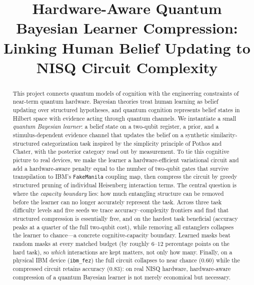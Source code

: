 \documentclass[conference]{IEEEtran}
\begin{document}
\title{Hardware-Aware Quantum Bayesian Learner Compression: Linking Human Belief Updating to NISQ Circuit Complexity}

\author{
}

\maketitle

\begin{abstract}
This project connects quantum models of cognition with the engineering constraints of
near-term quantum hardware. Bayesian theories treat human learning as belief updating
over structured hypotheses, and quantum cognition represents belief states in Hilbert
space with evidence acting through quantum channels. We instantiate a small \emph{quantum
Bayesian learner}: a belief state on a two-qubit register, a prior, and a
stimulus-dependent evidence channel that updates the belief on a synthetic
similarity-structured categorization task inspired by the simplicity principle of
Pothos and Chater, with the posterior category read out by measurement. To tie this
cognitive picture to real devices, we make the learner a hardware-efficient variational
circuit and add a hardware-aware penalty equal to the number of two-qubit gates that
survive transpilation to IBM's \texttt{FakeManila} coupling map, then compress the
circuit by greedy structured pruning of individual Heisenberg interaction terms. The
central question is where the \emph{capacity boundary} lies: how much entangling structure
can be removed before the learner can no longer accurately represent the task. Across three task difficulty
levels and five seeds we trace accuracy--complexity frontiers and find that structured
compression is essentially free, and on the hardest task beneficial (accuracy peaks at a
quarter of the full two-qubit cost), while removing all entanglers collapses the learner
to chance---a concrete cognitive-capacity boundary. Learned masks beat random masks at
every matched budget (by roughly $6$--$12$ percentage points on the hard task), so
\emph{which} interactions are kept matters, not only how many. Finally, on a physical IBM device (\texttt{ibm\_fez}) the full circuit
collapses to near chance ($0.60$) while the compressed circuit retains accuracy ($0.83$):
on real NISQ hardware, hardware-aware compression of a quantum Bayesian learner is not
merely economical but necessary.
\end{abstract}
\end{document}
